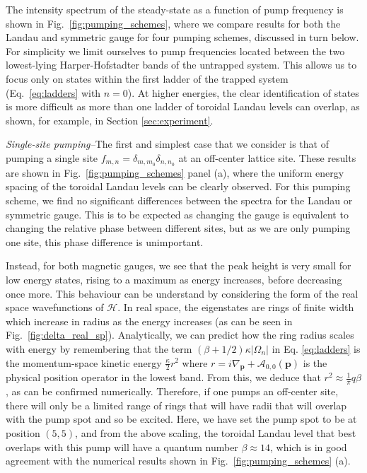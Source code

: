 The intensity spectrum of the steady-state as a function of pump
frequency is shown in Fig.~\ref{fig:pumping_schemes}, where we compare results for both the Landau and symmetric gauge for four pumping
schemes, discussed in turn below. For simplicity we limit ourselves to pump frequencies located between the two lowest-lying Harper-Hofstadter bands of the untrapped system. This allows us to focus only on states within the first ladder of the trapped system (Eq.~\eqref{eq:ladders} with $n = 0$). At higher energies, the clear identification of states is more difficult as more than one ladder of toroidal Landau levels can overlap, as shown, for example, in Section \ref{sec:experiment}. 

{\em{Single-site pumping--}}The first and simplest case that we consider is that of pumping a single site $f_{m,n} = \delta_{m,m_0} \delta_{n,n_0}$ at an off-center lattice site. These results are shown in Fig.~\ref{fig:pumping_schemes} panel (a), where the uniform energy spacing of the toroidal Landau levels can be clearly observed. For this pumping scheme, we find no significant differences between the spectra for the Landau or symmetric gauge. This is to be expected as changing the gauge is equivalent
to changing the relative phase between different sites, but as we are only pumping one site, this phase difference is unimportant.

 Instead, for both magnetic gauges, we see that the peak height is very small for low energy states, rising to a maximum as energy increases, before decreasing once more. This behaviour can be understand by considering the form of the real space wavefunctions of $\mathcal{H}$. 
In real space, the eigenstates are rings of finite width which increase in radius as the energy increases (as can be seen in Fig.~\ref{fig:delta_real_sp}). Analytically, we can predict how the ring radius scales with energy by remembering that the term
$(\beta + 1/2) \kappa |\Omega_n|$ in Eq. \ref{eq:ladders} is the momentum-space kinetic energy
$\frac{\kappa}{2}r^2$ where $r = i\nabla_{\mathbf{p}} + \mathcal{A}_{0, 0}(\mathbf{p})$ is the physical position operator in the lowest band. From this, we deduce that $r^2 \approx \frac{1}{\pi} q \beta$, as can be confirmed numerically. Therefore, if one pumps an off-center site, there will only be a
limited range of rings that will have radii that will overlap with
the pump spot and so be excited. Here, we have set the pump spot to be at position $(5,5)$, and from the above scaling, the toroidal Landau level that best overlaps with this pump will have a quantum number $\beta \approx 14$, which is in good agreement with the numerical results shown in
Fig.~\ref{fig:pumping_schemes} (a). 

